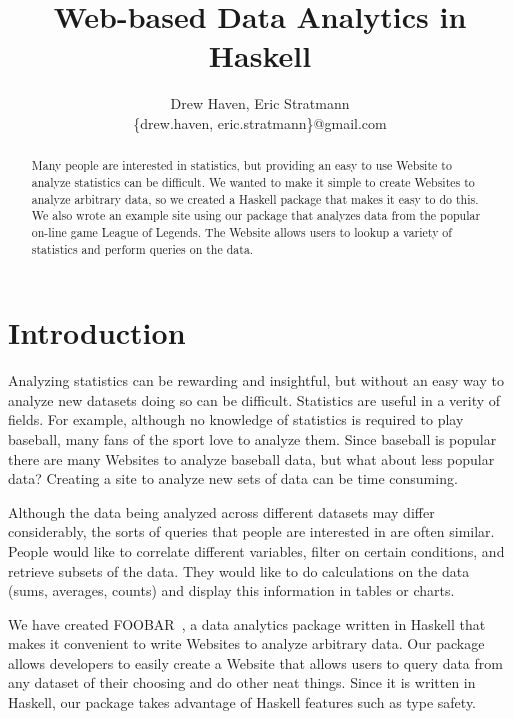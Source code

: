 \documentclass[letterpaper,twocolumn,9pt]{article}
\begin{document}
\title{\Large \bf Web-based Data Analytics in Haskell}

\date{}

\author{
{\rm Drew Haven, Eric Stratmann}\\
\{drew.haven, eric.stratmann\}@gmail.com
} %

\maketitle


\begin{abstract}
Many people are interested in statistics, but providing an easy to use Website to analyze statistics can be difficult. We wanted to make it simple to create Websites to analyze arbitrary data, so we created a Haskell package that makes it easy to do this. We also wrote an example site using our package that analyzes data from the popular on-line game League of Legends. The Website allows users to lookup a variety of statistics and perform queries on the data.
\end{abstract}

\section{Introduction}

Analyzing statistics can be rewarding and insightful, but without an easy way to analyze new datasets doing so can be difficult. Statistics are useful in a verity of fields. For example, although no knowledge of statistics is required to play baseball, many fans of the sport love to analyze them. Since baseball is popular there are many Websites to analyze baseball data, but what about less popular data? Creating a site to analyze new sets of data can be time consuming.

Although the data being analyzed across different datasets may differ considerably, the sorts of queries that people are interested in are often similar. People would like to correlate different variables, filter on certain conditions, and retrieve subsets of the data. They would like to do calculations on the data (sums, averages, counts) and display this information in tables or charts. 

We have created FOOBAR~\cite{foobar}, a data analytics package written in Haskell that makes it convenient to write Websites to analyze arbitrary data. Our package allows developers to easily create a Website that allows users to query data from any dataset of their choosing and do other neat things. Since it is written in Haskell, our package takes advantage of Haskell features such as type safety. 
\end{document}
